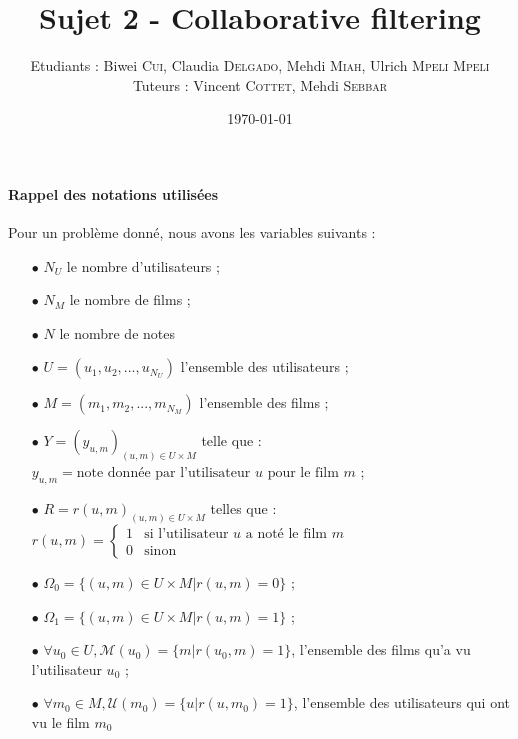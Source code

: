 \documentclass[a4paper, 11pt]{book}
\begin{document}
\title{Sujet 2 - Collaborative filtering}
\author{
Etudiants : Biwei \textsc{Cui}, Claudia \textsc{Delgado}, Mehdi \textsc{Miah}, Ulrich \textsc{Mpeli Mpeli} \\
Tuteurs : Vincent \textsc{Cottet}, Mehdi  \textsc{Sebbar}
}

\date{\today}
\maketitle

\tableofcontents
\newpage

\paragraph{Rappel des notations utilisées}

\medskip

Pour un problème donné, nous avons les variables suivants : \\
\begin{itemize}
\item[$\bullet$]  $N_U$ le nombre d'utilisateurs ; 
\item[$\bullet$]  $N_M$ le nombre de films ;
\item[$\bullet$]  $N$ le nombre de notes
\end{itemize}

\medskip

\begin{itemize}
\item[$\bullet$] $U = (u_1, u_2, ..., u_{N_U})$ l'ensemble des utilisateurs  ;
\item[$\bullet$]  $M = (m_1, m_2, ..., m_{N_M})$ l'ensemble des films ;
\item[$\bullet$]  $Y = (y_{u,m})_{(u, m) \in U \times M}$ telle que : $ y_{u,m} = \text{note donnée par l'utilisateur } u \text{ pour le film } m$ ; 
\item[$\bullet$]  $R = r(u,m)_{(u, m) \in U \times M}$ telles que :
$r(u,m) = 
\left\{
\begin{array}{ll}
1 & \text{si l'utilisateur } u \text{ a noté le film } m \\
0  & \text{sinon} \
\end{array}
\right.$
\end{itemize}

\medskip

\begin{itemize}
\item[$\bullet$]  $\Omega_0 = \{(u,m) \in U \times M | r(u,m) = 0 \}$ ;
\item[$\bullet$]  $\Omega_1 = \{(u,m) \in U \times M | r(u,m) = 1\}$ ;
\item[$\bullet$]  $\forall u_0 \in U, \mathcal{M}(u_0) = \{m | r(u_0,m) = 1 \}$, l'ensemble des films qu'a vu l'utilisateur $u_0$ ;
\item[$\bullet$]  $\forall m_0 \in M, \mathcal{U}(m_0) = \{u | r(u,m_0) = 1 \}$, l'ensemble des utilisateurs qui ont vu le film $m_0$
\end{itemize}
\end{document}
